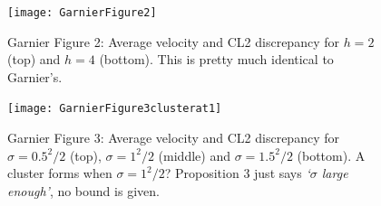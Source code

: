 \documentclass[11pt,a4paper, dvipsnames]{article}
\begin{document}
    \begin{figure}
        \centering
        \texttt{[image: GarnierFigure2]}
        \caption{Garnier Figure 2: Average velocity and CL2 discrepancy for $ h=2$ (top) and $h=4$ (bottom). This is pretty much identical to Garnier's.}
    \end{figure}

    \begin{figure}
        \centering
        \texttt{[image: GarnierFigure3clusterat1]}
        \caption{Garnier Figure 3: Average velocity and CL2 discrepancy for $\sigma = 0.5^2/2$ (top), $\sigma = 1^2/2$ (middle) and $\sigma = 1.5^2/2$ (bottom). A cluster forms when $\sigma=1^2/2$? Proposition 3 just says \emph{`$\sigma$ large enough'}, no bound is given.}
    \end{figure}
\end{document}
